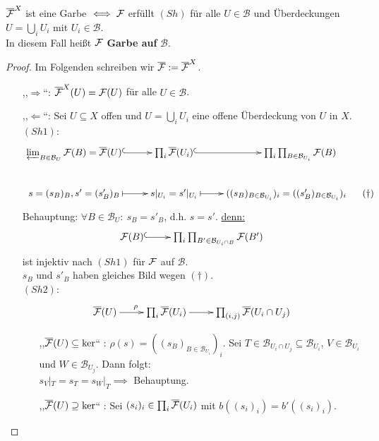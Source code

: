 \begin{prop}
\label{prop:garbe-auf-basis}
$\overline{\mathcal{F}}^{X}$ ist eine Garbe $\iff \mathcal{F}$ erfüllt $(Sh)$  für alle $U \in \mathcal{B}$ und Überdeckungen $U = \bigcup_{i} U_{i}$ mit $U_{i} \in \mathcal{B}$.\\
In diesem Fall heißt $\mathcal{F}$ \textbf{Garbe auf} $\mathcal{B}$. 
\end{prop}
\begin{proof}
	Im Folgenden schreiben wir $\overline{\mathcal{F}} := \overline{\mathcal{F}}^{X}$.
\begin{itemize}
	\item [,,$\Rightarrow$``:] $\overline{\mathcal{F}}^{X}(U) = \mathcal{F}(U)$ für alle $U \in \mathcal{B}$.
	\item [,,$\Leftarrow$``:] Sei $U \subseteq X$ offen und $U = \bigcup_{i} U_{i}$ eine offene Überdeckung von $U$ in $X$.\\
	\underline{$(Sh1)$}:
	\[
	\xymatrix {
		\varprojlim_{B \in \mathcal{B}_{U}} \sheaf{F}(B) = \overline{\sheaf{F}}(U)\ar@{^{(}->}[r] & \prod_{i} \overline{\sheaf{F}}(U_{i}) \ar@{^{(}->}[r]  & \prod_{i} \prod_{B \in \mathcal{B}_{U_{i}}} \sheaf{F}(B)\\
		s = (s_{B})_{B}, s' = (s'_{B})_{B} \ar@{|->}[r] & s|_{U_i} = s'|_{U_i} \ar@{|->}[r] & ( (s_{B})_{B \in \mathcal{B}_{U_{i}}} )_{i} = ( (s'_{B})_{B \in \mathcal{B}_{U_{i}}} )_{i} \ \ \ \ \ (\dagger)
	}
	\]
	Behauptung: $\forall B \in \mathcal{B}_{U}: \ s_{B} = s'_{B}$, d.h. $s = s'$. \underline{denn:} \\
	\[
	\xymatrix {
	  \sheaf{F}(B) \ar@{^{(}->}[r] & \prod_{i} \prod_{B' \in \mathcal{B}_{U_i \cap B}} \sheaf{F}(B') 
    } \]  ist injektiv nach $(Sh1)$ für $\mathcal{F}$ auf $\mathcal{B}$.\\
    $s_{B}$ und $s'_{B}$ haben gleiches Bild wegen $(\dagger)$.\\
    \underline{$(Sh2)$}:
    \[ \xymatrix{
    \overline{\sheaf{F}}(U) \ar^{\rho}@{->}[r] & \prod_{i} \overline{\sheaf{F}}(U_{i}) \ar@{->}[r] & \prod_{(i, j)} \overline{\sheaf{F}}(U_{i} \cap U_{j})
    }\]
    \begin{itemize}
    	\item[,,$\overline{\mathcal{F}}(U) \subseteq \ker$``]: $\rho(s) = ((s_{B})_{B \in \mathcal{B}_{U_{i}}})_{i}$. Sei $T \in \mathcal{B}_{U_{i} \cap U_{j}} \subseteq \mathcal{B}_{U_{i}}$, $V \in \mathcal{B}_{U_{i}}$ und $W \in \mathcal{B}_{U_{j}}$. Dann folgt: \\
    	$s_{V}|_{T} = s_{T} = s_{W}|_{T} \implies$ Behauptung.
    	\item[,,$\overline{\mathcal{F}}(U)\supseteq \ker$``]: Sei $(s_{i})_{i} \in \prod_{i} \overline{\mathcal{F}}(U_{i})$ mit $b((s_{i})_{i}) = b'((s_{i})_{i})$.\\

\end{itemize}
\end{itemize}
\end{proof}
